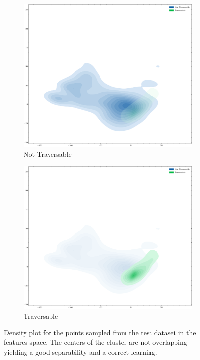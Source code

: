 \documentclass[../document.tex]{subfiles}
\begin{document}
\begin{figure}[H]
\begin{subfigure}[b]{0.48\textwidth}
    \includegraphics[width=\linewidth]{../img/5/pca/pca-test-0-density.png}
    \caption{Not Traversable}
\end{subfigure}
\begin{subfigure}[b]{0.48\textwidth}
    \includegraphics[width=\linewidth]{../img/5/pca/pca-test-1-density.png}
    \caption{Traversable}
    \label{fig : pca-test-density-1}
\end{subfigure}
\caption{Density plot for the points sampled from the test dataset in the features space. The centers of the cluster are not overlapping yielding a good separability and a correct learning.}
\end{figure}
\end{document}
